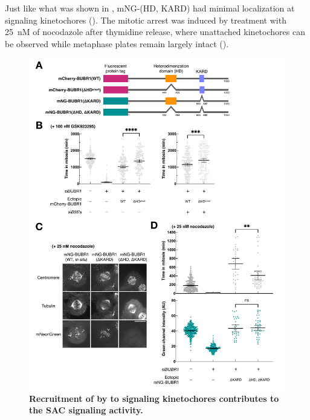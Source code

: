 Just like what was shown in \cite{BubBiochem}, mNG-(\textDelta{}HD, \textDelta{}KARD) had minimal localization at signaling kinetochores  (). The mitotic arrest was induced by treatment with \SI{25}{nM} of nocodazole \cite{25nMNoc} after thymidine release, where unattached kinetochores can be observed while metaphase plates remain largely intact ().

\begin{figure} [b!]
    \centering
    \includegraphics[width=\textwidth]{chapters/figures/RescueExperiment.pdf}
    \caption{\textbf{Recruitment of  by  to signaling kinetochores  contributes to the SAC signaling activity.}}
    \label{RescueExperiment}
\end{figure}

